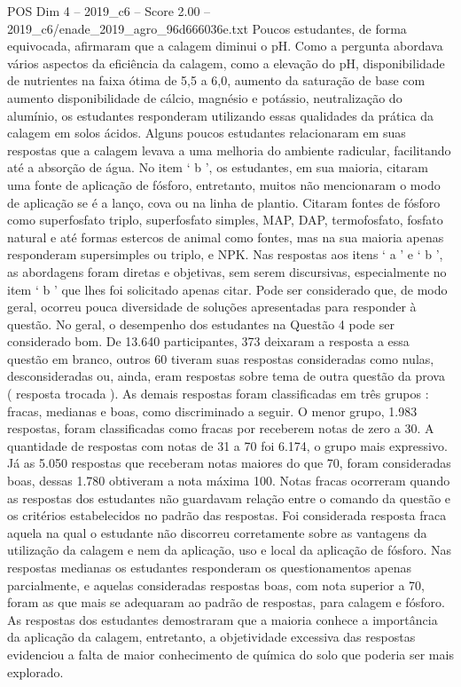 \begin{textsample}{POS Dim 4 – 2019\_c6 – Score 2.00 – 2019\_c6/enade\_2019\_agro\_96d666036e.txt}
Poucos estudantes, de forma equivocada, afirmaram que a calagem diminui o pH.
Como a pergunta abordava vários aspectos da eficiência da calagem, como a elevação do pH, disponibilidade de nutrientes na faixa ótima de 5,5 a 6,0, aumento da saturação de base com aumento disponibilidade de cálcio, magnésio e potássio, neutralização do alumínio, os estudantes responderam utilizando essas qualidades da prática da calagem em solos ácidos.
Alguns poucos estudantes relacionaram em suas respostas que a calagem levava a uma melhoria do ambiente radicular, facilitando até a absorção de água.
No item ‘ b ’, os estudantes, em sua maioria, citaram uma fonte de aplicação de fósforo, entretanto, muitos não mencionaram o modo de aplicação se é a lanço, cova ou na linha de plantio.
Citaram fontes de fósforo como superfosfato triplo, superfosfato simples, MAP, DAP, termofosfato, fosfato natural e até formas estercos de animal como fontes, mas na sua maioria apenas responderam supersimples ou triplo, e NPK.
Nas respostas aos itens ‘ a ’ e ‘ b ’, as abordagens foram diretas e objetivas, sem serem discursivas, especialmente no item ‘ b ’ que lhes foi solicitado apenas citar.
Pode ser considerado que, de modo geral, ocorreu pouca diversidade de soluções apresentadas para responder à questão.
No geral, o desempenho dos estudantes na Questão 4 pode ser considerado bom.
De 13.640 participantes, 373 deixaram a resposta a essa questão em branco, outros 60 tiveram suas respostas consideradas como nulas, desconsideradas ou, ainda, eram respostas sobre tema de outra questão da prova ( resposta trocada ).
As demais respostas foram classificadas em três grupos : fracas, medianas e boas, como discriminado a seguir.
O menor grupo, 1.983 respostas, foram classificadas como fracas por receberem notas de zero a 30.
A quantidade de respostas com notas de 31 a 70 foi 6.174, o grupo mais expressivo.
Já as 5.050 respostas que receberam notas maiores do que 70, foram consideradas boas, dessas 1.780 obtiveram a nota máxima 100.
Notas fracas ocorreram quando as respostas dos estudantes não guardavam relação entre o comando da questão e os critérios estabelecidos no padrão das respostas.
Foi considerada resposta fraca aquela na qual o estudante não discorreu corretamente sobre as vantagens da utilização da calagem e nem da aplicação, uso e local da aplicação de fósforo.
Nas respostas medianas os estudantes responderam os questionamentos apenas parcialmente, e aquelas consideradas respostas boas, com nota superior a 70, foram as que mais se adequaram ao padrão de respostas, para calagem e fósforo.
As respostas dos estudantes demostraram que a maioria conhece a importância da aplicação da calagem, entretanto, a objetividade excessiva das respostas evidenciou a falta de maior conhecimento de química do solo que poderia ser mais explorado.

\end{textsample}
